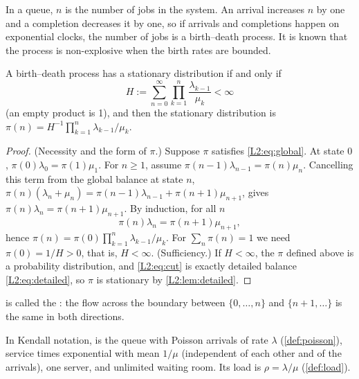 In a queue, $n$ is the number of jobs in the system. An arrival increases $n$ by one
and a completion decreases it by one, so if arrivals and completions happen on
exponential clocks, the number of jobs is a birth--death process. It is known that
the process is non-explosive when the birth rates are bounded.

\begin{theorem}\label{thm:birthdeath}
A birth--death process has a stationary distribution if and only if
\begin{equation}\label{L2:eq:bdsum}
  H:=\sum_{n=0}^{\infty}\prod_{k=1}^{n}\frac{\lambda_{k-1}}{\mu_k}<\infty
\end{equation}
(an empty product is 1), and then the stationary distribution is
$\pi(n)=H^{-1}\prod_{k=1}^{n}\lambda_{k-1}/\mu_k$.
\end{theorem}
\begin{proof}
(Necessity and the form of $\pi$.) Suppose $\pi$ satisfies \eqref{L2:eq:global}. At
state $0$, $\pi(0)\lambda_0=\pi(1)\mu_1$. For $n\ge1$, assume
$\pi(n-1)\lambda_{n-1}=\pi(n)\mu_n$. Cancelling this term from the global balance at
state $n$, $\pi(n)(\lambda_n+\mu_n)=\pi(n-1)\lambda_{n-1}+\pi(n+1)\mu_{n+1}$, gives
$\pi(n)\lambda_n=\pi(n+1)\mu_{n+1}$. By induction, for all $n$
\begin{equation}\label{L2:eq:cut}
  \pi(n)\lambda_n=\pi(n+1)\mu_{n+1},
\end{equation}
hence $\pi(n)=\pi(0)\prod_{k=1}^n\lambda_{k-1}/\mu_k$. For $\sum_n\pi(n)=1$ we need
$\pi(0)=1/H>0$, that is, $H<\infty$.
(Sufficiency.) If $H<\infty$, the $\pi$ defined above is a probability distribution,
and \eqref{L2:eq:cut} is exactly detailed balance \eqref{L2:eq:detailed}, so $\pi$ is
stationary by \cref{L2:lem:detailed}.
\end{proof}

 is called the : the flow across the boundary
between $\{0,\dots,n\}$ and $\{n+1,\dots\}$ is the same in both directions.

\begin{definition}[M/M/1 queue]\label{L2:def:mm1}
In Kendall notation,  is the queue with Poisson arrivals of rate $\lambda$
(\cref{def:poisson}), service times exponential with mean $1/\mu$ (independent of each
other and of the arrivals), one server, and unlimited waiting room. Its load is
$\rho=\lambda/\mu$ (\cref{def:load}).
\end{definition}

